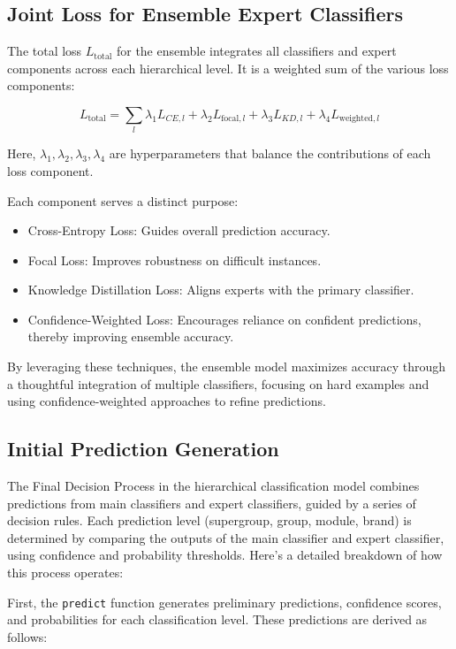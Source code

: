 \documentclass[9pt,a4paper,twoside]{rho-class/rho}
\begin{document}
 \subsection{Joint Loss for Ensemble Expert Classifiers}
    
        The total loss \( L_{\text{total}} \) for the ensemble integrates all classifiers and expert components across each hierarchical level. It is a weighted sum of the various loss components:

   \[
   L_{\text{total}} = \sum_{l} \lambda_1 L_{CE,l} + \lambda_2 L_{\text{focal},l} + \lambda_3 L_{KD,l} + \lambda_4 L_{\text{weighted},l}
   \]

   Here, \( \lambda_1, \lambda_2, \lambda_3, \lambda_4 \) are hyperparameters that balance the contributions of each loss component.

Each component serves a distinct purpose:
\begin{itemize}
    \item Cross-Entropy Loss: Guides overall prediction accuracy.
    \item Focal Loss: Improves robustness on difficult instances.
    \item Knowledge Distillation Loss: Aligns experts with the primary classifier.
    \item Confidence-Weighted Loss: Encourages reliance on confident predictions, thereby improving ensemble accuracy.
\end{itemize}

By leveraging these techniques, the ensemble model maximizes accuracy through a thoughtful integration of multiple classifiers, focusing on hard examples and using confidence-weighted approaches to refine predictions.

 \subsection{Initial Prediction Generation}
    
      The Final Decision Process in the hierarchical classification model combines predictions from main classifiers and expert classifiers, guided by a series of decision rules. Each prediction level (supergroup, group, module, brand) is determined by comparing the outputs of the main classifier and expert classifier, using confidence and probability thresholds. Here’s a detailed breakdown of how this process operates:

First, the \verb|predict| function generates preliminary predictions, confidence scores, and probabilities for each classification level. These predictions are derived as follows:
\end{document}
